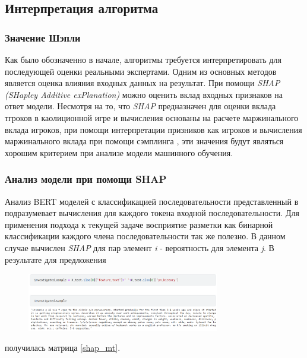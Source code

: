 \subsection{Интерпретация алгоритма}
\subsubsection{Значение Шэпли}
Как было обозначенно в начале, алгоритмы требуется интерпретировать для последующей оценки реальными экспертами. Одним из основных методов является оценка влияния входных данных на результат. При помощи \textit{SHAP (SHapley Additive exPlanation)} можно оценить вклад входных признаков на ответ модели. Несмотря на то, что \textit{SHAP} предназначен для оценки вклада тгроков в каолиционной игре и вычисления основаны на расчете маржинального вклада игроков, при помощи интерпретации призников как игроков и вычисления маржинального вклада при помощи сэмплинга \cite{model_expl}, эти значения будут являться хорошим критерием при анализе модели машинного обучения\cite{shap_models}.
\subsubsection{Анализ модели при помощи SHAP}
Анализ BERT моделей с классификацией последовательности представленный в \cite{bert_shap} подразумевает вычисления для каждого токена входной последовательности. Для применения подхода к текущей задаче восприятие разметки как бинарной классификации каждого члена последовательности так же полезно. В данном случае вычислен \textit{SHAP} для пар элемент \textit{i} - вероятность для элемента \textit{j}.
\newline
В результате для предложения 
\begin{figure}[h]
\centering
\includegraphics[width=0.75\textwidth]{sample.png}
\label{sample_txt}
\end{figure}
получилась матрица \ref{shap_mt}.

